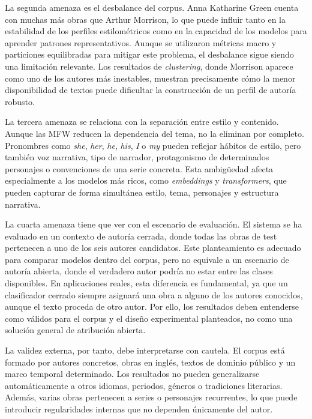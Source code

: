 \documentclass[IB]{TFUOC}%
\begin{document}
La segunda amenaza es el desbalance del corpus. Anna Katharine Green cuenta con muchas más obras que Arthur Morrison, lo que puede influir tanto en la estabilidad de los perfiles estilométricos como en la capacidad de los modelos para aprender patrones representativos. Aunque se utilizaron métricas macro y particiones equilibradas para mitigar este problema, el desbalance sigue siendo una limitación relevante. Los resultados de \textit{clustering}, donde Morrison aparece como uno de los autores más inestables, muestran precisamente cómo la menor disponibilidad de textos puede dificultar la construcción de un perfil de autoría robusto.

La tercera amenaza se relaciona con la separación entre estilo y contenido. Aunque las MFW reducen la dependencia del tema, no la eliminan por completo. Pronombres como \textit{she}, \textit{her}, \textit{he}, \textit{his}, \textit{I} o \textit{my} pueden reflejar hábitos de estilo, pero también voz narrativa, tipo de narrador, protagonismo de determinados personajes o convenciones de una serie concreta. Esta ambigüedad afecta especialmente a los modelos más ricos, como \textit{embeddings} y \textit{transformers}, que pueden capturar de forma simultánea estilo, tema, personajes y estructura narrativa.

La cuarta amenaza tiene que ver con el escenario de evaluación. El sistema se ha evaluado en un contexto de autoría cerrada, donde todas las obras de test pertenecen a uno de los seis autores candidatos. Este planteamiento es adecuado para comparar modelos dentro del corpus, pero no equivale a un escenario de autoría abierta, donde el verdadero autor podría no estar entre las clases disponibles. En aplicaciones reales, esta diferencia es fundamental, ya que un clasificador cerrado siempre asignará una obra a alguno de los autores conocidos, aunque el texto proceda de otro autor. Por ello, los resultados deben entenderse como válidos para el corpus y el diseño experimental planteados, no como una solución general de atribución abierta.

La validez externa, por tanto, debe interpretarse con cautela. El corpus está formado por autores concretos, obras en inglés, textos de dominio público y un marco temporal determinado. Los resultados no pueden generalizarse automáticamente a otros idiomas, periodos, géneros o tradiciones literarias. Además, varias obras pertenecen a series o personajes recurrentes, lo que puede introducir regularidades internas que no dependen únicamente del autor.
\end{document}
